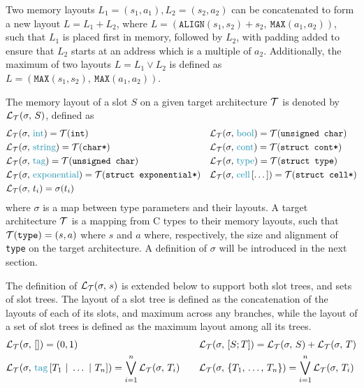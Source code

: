 Two memory layouts $L_1 = (s_1, a_1), L_2 = (s_2, a_2)$ can be concatenated to form a new layout $L = L_1 + L_2$, where $L = (\texttt{ALIGN}(s_1, s_2) + s_2,\ \texttt{MAX}(a_1, a_2))$, such that $L_1$ is placed first in memory, followed by $L_2$, with padding added to ensure that $L_2$ starts at an address which is a multiple of $a_2$. Additionally, the maximum of two layouts $L = L_1 \vee L_2$ is defined as $L = (\texttt{MAX}(s_1, s_2),\ \texttt{MAX}(a_1, a_2))$.

The memory layout of a slot $S$ on a given target architecture $\mathcal{T}$ is denoted by $\mathcal{L}_{\mathcal{T}}(\sigma,\,S)$, defined as
\[\begin{aligned}
    &\slotlayout{\sigma}{\ints} = \archlayout{int} && \slotlayout{\sigma}{\bools} = \archlayout{unsigned char} \\
    &\slotlayout{\sigma}{\strings} = \archlayout{char*} && \slotlayout{\sigma}{\conts} = \archlayout{struct cont*} \\
    &\slotlayout{\sigma}{\tags} = \archlayout{unsigned char} && \slotlayout{\sigma}{\types} = \archlayout{struct type} \\
    &\slotlayout{\sigma}{\exponentials} = \archlayout{struct exponential*} && \slotlayout{\sigma}{\cells{\dots}} = \archlayout{struct cell*} \\
    &\slotlayout{\sigma}{t_i} = \layoutofvar{\sigma}{t_i}\\
\end{aligned}\]
where $\sigma$ is a map between type parameters and their layouts. A target architecture $\mathcal{T}$ is a mapping from C types to their memory layouts, such that $\mathcal{T}(\texttt{type}) = (s, a)$ where $s$ and $a$ where, respectively, the size and alignment of \texttt{type} on the target architecture. A definition of $\sigma$ will be introduced in the next section.

The definition of $\mathcal{L}_{\mathcal{T}}(\sigma,\,s)$ is extended below to support both slot trees, and sets of slot trees. The layout of a slot tree is defined as the concatenation of the layouts of each of its slots, and maximum across any branches, while the layout of a set of slot trees is defined as the maximum layout among all its trees.
\[\begin{aligned}
    &\slotlayout{\sigma}{\nilst} = (0, 1) \quad & & \slotlayout{\sigma}{\seqst{S; T}} = \slotlayout{\sigma}{S} + \slotlayout{\sigma}{T}\\
    &\slotlayout{\sigma}{\tagst{T_1 \tagsepst \dots \tagsepst T_n}} = \bigvee_{i=1}^{n} \slotlayout{\sigma}{T_i} \quad & & \slotlayout{\sigma}{\left\{T_1,\,\dots,\,T_n\right\}} = \bigvee_{i=1}^{n} \slotlayout{\sigma}{T_i}
\end{aligned}\]

